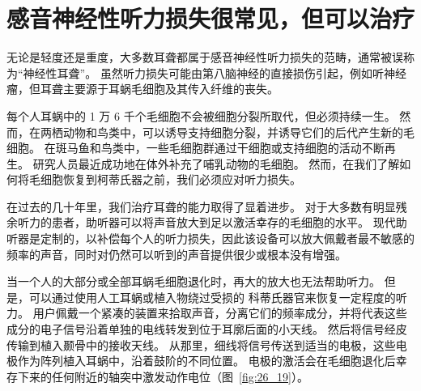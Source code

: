 \section{感音神经性听力损失很常见，但可以治疗}

无论是轻度还是重度，大多数耳聋都属于感音神经性听力损失的范畴，通常被误称为“神经性耳聋”。
虽然听力损失可能由第八脑神经的直接损伤引起，例如听神经瘤，但耳聋主要源于耳蜗毛细胞及其传入纤维的丧失。


每个人耳蜗中的 1 万 6 千个毛细胞不会被细胞分裂所取代，但必须持续一生。
然而，在两栖动物和鸟类中，可以诱导支持细胞分裂，并诱导它们的后代产生新的毛细胞。
在斑马鱼和鸟类中，一些毛细胞群通过干细胞或支持细胞的活动不断再生。
研究人员最近成功地在体外补充了哺乳动物的毛细胞。 然而，在我们了解如何将毛细胞恢复到柯蒂氏器之前，我们必须应对听力损失。


在过去的几十年里，我们治疗耳聋的能力取得了显着进步。
对于大多数有明显残余听力的患者，助听器可以将声音放大到足以激活幸存的毛细胞的水平。
现代助听器是定制的，以补偿每个人的听力损失，因此该设备可以放大佩戴者最不敏感的频率的声音，同时对仍然可以听到的声音提供很少或根本没有增强。


当一个人的大部分或全部耳蜗毛细胞退化时，再大的放大也无法帮助听力。
但是，可以通过使用人工耳蜗或植入物绕过受损的 科蒂氏器官来恢复一定程度的听力。
用户佩戴一个紧凑的装置来拾取声音，分离它们的频率成分，并将代表这些成分的电子信号沿着单独的电线转发到位于耳廓后面的小天线。
然后将信号经皮传输到植入颞骨中的接收天线。
从那里，细线将信号传送到适当的电极，这些电极作为阵列植入耳蜗中，沿着鼓阶的不同位置。
电极的激活会在毛细胞退化后幸存下来的任何附近的轴突中激发动作电位（图~\ref{fig:26_19}）。


